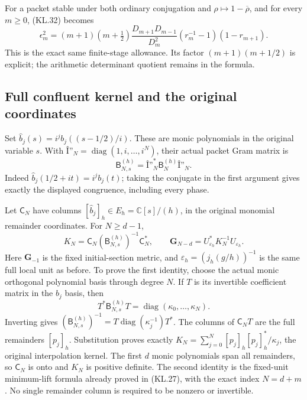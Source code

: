 For a packet stable under both ordinary conjugation and
\(\rho\mapsto1-\overline\rho\), and for every \(m\geq0\),
(KL.32) becomes
\[
 \boxed{\epsilon_m^2=(m+1)(m+\tfrac12)
       \frac{D_{m+1}D_{m-1}}{D_m^2}
           (r_m^{-1}-1)(1-r_{m+1}).}
                                                               \tag{TG.19}
\]
This is the exact same finite-stage allowance.  Its factor
\((m+1)(m+1/2)\) is explicit; the arithmetic determinant
quotient remains in the formula.

\subsection{Full confluent kernel and the original coordinates}

Set \(\widehat b_j(s)=i^j b_j((s-1/2)/i)\).  These are monic
polynomials in the original variable \(s\).  With
\(\mathord{\textsf{Î”}}_N=\operatorname{diag}(1,i,\ldots,i^N)\),
their actual packet Gram matrix is
\[
 \mathsf B_{N,s}^{(h)}=\mathord{\textsf{Î”}}_N^*
                  \mathsf B_N^{(h)}\mathord{\textsf{Î”}}_N.
                                                               \tag{TG.20}
\]
Indeed \(\widehat b_j(1/2+it)=i^j b_j(t)\); taking the
conjugate in the first argument gives exactly the displayed
congruence, including every phase.

Let \(\mathsf C_N\) have columns
\([\widehat b_j]_h\in E_h=\mathbb C[s]/(h)\), in the original
monomial remainder coordinates.  For \(N\geq d-1\),
\[
 \boxed{K_N=\mathsf C_N(\mathsf B_{N,s}^{(h)})^{-1}
                           \mathsf C_N^*,\qquad
  \mathbf G_{N-d}=U_{\varepsilon_h}^*K_N^{-1}
                           U_{\varepsilon_h}.}
                                                               \tag{TG.21}
\]
Here \(\mathbf G_{-1}\) is the fixed initial-section metric,
and \(\varepsilon_h=(j_h(g/h))^{-1}\) is the same full local
unit as before.  To prove the first identity, choose the actual
monic orthogonal polynomial basis through degree \(N\).  If
\(T\) is its invertible coefficient matrix in the
\(\widehat b_j\) basis, then
\[
 T^*\mathsf B_{N,s}^{(h)}T
     =\operatorname{diag}(\kappa_0,\ldots,\kappa_N).
\]
Inverting gives
\((\mathsf B_{N,s}^{(h)})^{-1}
 =T\operatorname{diag}(\kappa_j^{-1})T^*\).
The columns of \(\mathsf C_NT\) are the full remainders
\([p_j]_h\).  Substitution proves exactly
\(K_N=\sum_{j=0}^N[p_j]_h[p_j]_h^*/\kappa_j\), the original
interpolation kernel.  The first \(d\) monic polynomials span all
remainders, so \(\mathsf C_N\) is onto and \(K_N\) is positive
definite.  The second identity is the fixed-unit minimum-lift
formula already proved in (KL.27), with the exact index
\(N=d+m\).  No single remainder column is required to be nonzero
or invertible.

